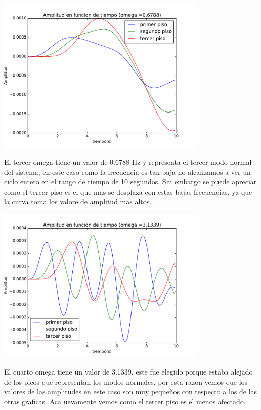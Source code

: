 \documentclass[11pt,letterpaper]{exam}
\begin{document}
\begin{center}
\includegraphics[width=10cm]{avst_o3.pdf} 
\end{center} 
El tercer omega tiene un valor de 0.6788 Hz y representa el tercer modo normal del sistema, en este caso como la frecuencia es tan baja no alcanzamos a ver un ciclo entero en el rango de tiempo de 10 segundos. Sin embargo se puede apreciar como el tercer piso es el que mas se desplaza con estas bajas frecuencias, ya que la curva toma los valore de amplitud mas altos.

\begin{center}
\includegraphics[width=10cm]{avst_o4.pdf} 
\end{center} 

El cuarto omega tiene un valor de 3.1339, este fue elegido porque estaba alejado de los picos que representan los modos normales, por esta razon vemos que los valores de las amplitudes en este caso son muy pequeños con respecto a los de las otras graficas. Aca uevamente vemos como el tercer piso es el menos afectado.
\end{document}
